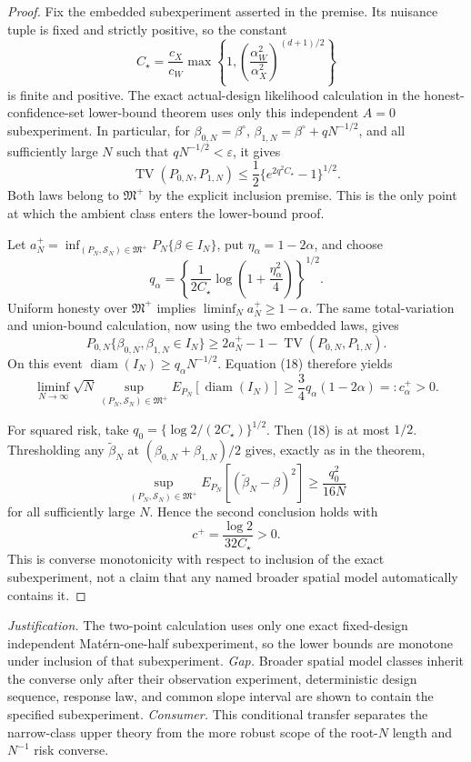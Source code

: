 \documentclass{article}
\begin{document}
\begin{proof}
Fix the embedded subexperiment asserted in the premise.  Its nuisance tuple is fixed and strictly positive, so the constant
\[
 C_\star=\frac{c_X}{c_W}
 \max\left\{1,\left(\frac{\alpha_W^2}{\alpha_X^2}\right)^{(d+1)/2}\right\}
\]
is finite and positive.  The exact actual-design likelihood calculation in the honest-confidence-set lower-bound theorem uses only this independent \(A=0\) subexperiment.  In particular, for \(\beta_{0,N}=\beta^\circ\), \(\beta_{1,N}=\beta^\circ+qN^{-1/2}\), and all sufficiently large \(N\) such that \(qN^{-1/2}<\varepsilon\), it gives
\[
 \operatorname{TV}(P_{0,N},P_{1,N})
 \leq\frac12\{e^{2q^2C_\star}-1\}^{1/2}.
 \tag{18}
\]
Both laws belong to \(\mathfrak M^+\) by the explicit inclusion premise.  This is the only point at which the ambient class enters the lower-bound proof.

Let \(a_N^+=\inf_{(P_N,\mathcal S_N)\in\mathfrak M^+}P_N\{\beta\in I_N\}\), put \(\eta_\alpha=1-2\alpha\), and choose
\[
 q_\alpha=\left\{\frac{1}{2C_\star}
 \log\left(1+\frac{\eta_\alpha^2}{4}\right)\right\}^{1/2}.
\]
Uniform honesty over \(\mathfrak M^+\) implies \(\liminf_Na_N^+\geq1-\alpha\).  The same total-variation and union-bound calculation, now using the two embedded laws, gives
\[
 P_{0,N}\{\beta_{0,N},\beta_{1,N}\in I_N\}
 \geq2a_N^+-1-\operatorname{TV}(P_{0,N},P_{1,N}).
\]
On this event \(\operatorname{diam}(I_N)\geq q_\alpha N^{-1/2}\).  Equation (18) therefore yields
\[
 \liminf_{N\to\infty}\sqrt N
 \sup_{(P_N,\mathcal S_N)\in\mathfrak M^+}
 E_{P_N}[\operatorname{diam}(I_N)]
 \geq\frac34q_\alpha(1-2\alpha)=:c_\alpha^+>0.
\]

For squared risk, take \(q_0=\{\log2/(2C_\star)\}^{1/2}\).  Then (18) is at most \(1/2\).  Thresholding any \(\widetilde\beta_N\) at \((\beta_{0,N}+\beta_{1,N})/2\) gives, exactly as in the theorem,
\[
 \sup_{(P_N,\mathcal S_N)\in\mathfrak M^+}
 E_{P_N}[(\widetilde\beta_N-\beta)^2]
 \geq\frac{q_0^2}{16N}
\]
for all sufficiently large \(N\).  Hence the second conclusion holds with
\[
 c^+=\frac{\log2}{32C_\star}>0.
\]
This is converse monotonicity with respect to inclusion of the exact subexperiment, not a claim that any named broader spatial model automatically contains it.
\end{proof}
\par\smallskip\noindent \textit{Justification.} The two-point calculation uses only one exact fixed-design independent Mat\'ern-one-half subexperiment, so the lower bounds are monotone under inclusion of that subexperiment. \textit{Gap.} Broader spatial model classes inherit the converse only after their observation experiment, deterministic design sequence, response law, and common slope interval are shown to contain the specified subexperiment. \textit{Consumer.} This conditional transfer separates the narrow-class upper theory from the more robust scope of the root-\(N\) length and \(N^{-1}\) risk converse.
\end{document}
